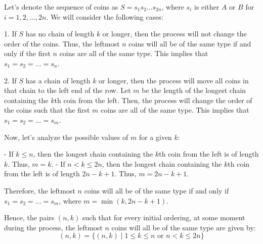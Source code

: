 Let's denote the sequence of coins as \( S = s_1s_2\ldots s_{2n} \), where \( s_i \) is either \( A \) or \( B \) for \( i = 1, 2, \ldots, 2n \). We will consider the following cases:

1. If \( S \) has no chain of length \( k \) or longer, then the process will not change the order of the coins. Thus, the leftmost \( n \) coins will all be of the same type if and only if the first \( n \) coins are all of the same type. This implies that \( s_1 = s_2 = \ldots = s_n \).

2. If \( S \) has a chain of length \( k \) or longer, then the process will move all coins in that chain to the left end of the row. Let \( m \) be the length of the longest chain containing the \( k \)th coin from the left. Then, the process will change the order of the coins such that the first \( m \) coins are all of the same type. This implies that \( s_1 = s_2 = \ldots = s_m \).

Now, let's analyze the possible values of \( m \) for a given \( k \):

- If \( k \leq n \), then the longest chain containing the \( k \)th coin from the left is of length \( k \). Thus, \( m = k \).
- If \( n < k \leq 2n \), then the longest chain containing the \( k \)th coin from the left is of length \( 2n - k + 1 \). Thus, \( m = 2n - k + 1 \).

Therefore, the leftmost \( n \) coins will all be of the same type if and only if \( s_1 = s_2 = \ldots = s_m \), where \( m = \min(k, 2n - k + 1) \).

Hence, the pairs \( (n, k) \) such that for every initial ordering, at some moment during the process, the leftmost \( n \) coins will all be of the same type are given by:
\[ (n, k) = \{(n, k) \mid 1 \leq k \leq n \text{ or } n < k \leq 2n\} \]
